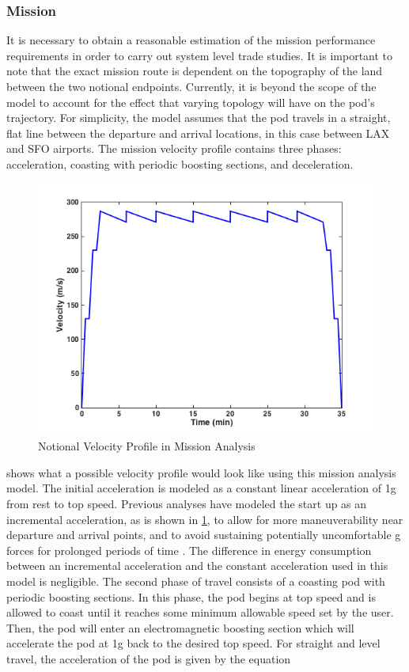 \subsubsection{Mission}
	It is necessary to obtain a reasonable estimation of the mission performance requirements in order to carry out system level trade studies. It is important to note that the exact mission route is dependent on the topography of the land between the two notional endpoints. Currently, it is beyond the scope of the model to account for the effect that varying topology will have on the pod’s trajectory. For simplicity, the model assumes that the pod travels in a straight, flat line between the departure and arrival locations, in this case between LAX and SFO airports. The mission velocity profile contains three phases: acceleration, coasting with periodic boosting sections, and deceleration.
	\begin{figure}
		\centering
		\includegraphics{../images/mission_profile.png}
		\caption{Notional Velocity Profile in Mission Analysis}
		\label{fig:mission_profile}
	\end{figure}
	 shows what a possible velocity profile would look like using this mission analysis model. The initial acceleration is modeled as a constant linear acceleration of 1g from rest to top speed. Previous analyses have modeled the start up as an incremental acceleration, as is shown in \cref{fig:mission_profile}, to allow for more maneuverability near departure and arrival points, and to avoid sustaining potentially uncomfortable g forces for prolonged periods of time \cite{Chin}. The difference in energy consumption between an incremental acceleration and the constant acceleration used in this model is negligible. The second phase of travel consists of a coasting pod with periodic boosting sections. In this phase, the pod begins at top speed and is allowed to coast until it reaches some minimum allowable speed set by the user. Then, the pod will enter an electromagnetic boosting section which will accelerate the pod at 1g back to the desired top speed. For straight and level travel, the acceleration of the pod is given by the equation
